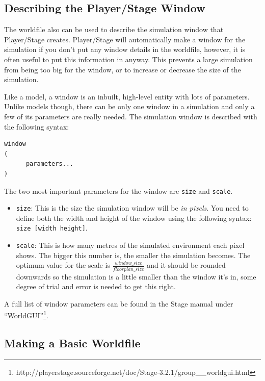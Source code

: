 \documentclass[a4paper]{report}
\newcommand{\plst}{Player/Stage\xspace}
\begin{document}
\subsection{Describing the \plst Window}

The worldfile also can be used to describe the simulation window that \plst creates. \plst will automatically make a window for the simulation if you don't put any window details in the worldfile, however, it is often useful to put this information in anyway. This prevents a large simulation from being too big for the window, or to increase or decrease the size of the simulation.

Like a model, a window is an inbuilt, high-level entity with lots of parameters. Unlike models though, there can be only one window in a simulation and only a few of its parameters are really needed. The simulation window is described with the following syntax:
\begin{verbatim}
window
(
      parameters...
)
\end{verbatim}

The two most important parameters for the window are \verb|size| and \verb|scale|.
\begin{itemize}
\item \verb|size|: This is the size the simulation window will be \emph{in pixels}. You need to define both the width and height of the window using the following syntax: \verb|size [width height]|. 
\item \verb|scale|: This is how many metres of the simulated environment each pixel shows. The bigger this number is, the smaller the simulation becomes. The optimum value for the scale is $\frac{window\_size}{floorplan\_size}$ and it should be rounded downwards so the simulation is a little smaller than the window it's in, some degree of trial and error is needed to get this right. 
\end{itemize}

A full list of window parameters can be found in the Stage manual under ``WorldGUI''\footnote{http://playerstage.sourceforge.net/doc/Stage-3.2.1/group\_\_worldgui.html}.

\subsection{Making a Basic Worldfile}\label{sec:basicWorldfile}
\end{document}
